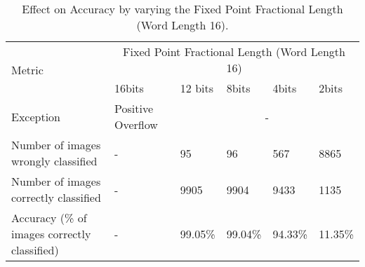 \begin{table}[!h]
\centering
\caption{Effect on Accuracy by varying the Fixed Point Fractional Length (Word Length 16).}
\label{Results Fixed2}
\begin{tabular}{||m{4cm}|m{2cm}|m{1.5cm}|m{1.5cm}|m{1.5cm}|m{1.5cm}||}
\hline
\multirow{2}{*}{Metric} &  \multicolumn{5}{|c||}{ Fixed Point Fractional Length (Word Length 16)} \\\cline{2-6}
& 16bits&12 bits &8bits&4bits&2bits \\
\hline
\hline
Exception& Positive Overflow &\multicolumn{4}{|c||}{-}\\
\hline
Number of images wrongly classified    &- &95 &96 &567 &8865\\
\hline
Number of images correctly classified  &- &9905&9904&9433&1135\\
\hline
Accuracy (\% of images correctly classified)&- &99.05\%&99.04\%&94.33\%&11.35\%\\
\hline
\end{tabular}

\end{table}